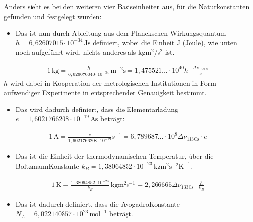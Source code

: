 \documentclass[letterpaper,10pt,english]{jupyterBook}
\begin{document}
\sphinxAtStartPar
Anders sieht es bei den weiteren vier Basiseinheiten aus, für die Naturkonstanten gefunden und festgelegt wurden:
\begin{itemize}
\item {} 
\sphinxAtStartPar
Das  ist nun durch Ableitung aus dem Planckschen Wirkungsquantum \(h = 6,62607015 \cdot 10^{-34}\,\mathrm{Js}\) definiert, wobei die Einheit J (Joule), wie unten noch aufgeführt wird, nichts anderes als kgm\(^2\)/s\(^2\) ist.

\end{itemize}
\begin{equation*}
\begin{split}1\,\mathrm{kg} = \frac{h}{6,626070040 \cdot 10^{-34}}\,\mathrm{m^{−2} s} = 1,475521... \cdot 10^{40} h \cdot \frac{\Delta \nu_\mathrm{133Cs}}{c}\end{split}
\end{equation*}
\sphinxAtStartPar
\(h\) wird dabei in Kooperation der metrologischen Institutionen in Form aufwendiger Experimente in entsprechender Genauigkeit bestimmt.
\begin{itemize}
\item {} 
\sphinxAtStartPar
Das  wird dadurch definiert, dass die Elementarladung \(e = 1,602 176 620 8 \cdot 10^{−19}\,\mathrm{As}\) beträgt:

\end{itemize}
\begin{equation*}
\begin{split} 1\,\mathrm A = \frac{e}{1,6021766208\cdot 10^{−19}}s^{−1} = 6,789687...\cdot 10^8 \Delta \nu_\mathrm{133Cs}\cdot e \end{split}
\end{equation*}\begin{itemize}
\item {} 
\sphinxAtStartPar
Das  ist die Einheit der thermodynamischen Temperatur, über die Boltzmann\sphinxhyphen{}Konstante \(k_B = 1,380 648 52 \cdot 10^{−23}\,\mathrm{kg m^2 s^{−2} K^{−1}}\).

\end{itemize}
\begin{equation*}
\begin{split} 1\,\mathrm K = \frac{1,38064852\cdot 10^{−23}}{k_B}\,\mathrm{kg m^2 s^{−1}} = 2,266665 \Delta \nu_\mathrm{133Cs} \cdot \frac{h}{k_B} \end{split}
\end{equation*}\begin{itemize}
\item {} 
\sphinxAtStartPar
Das  ist dadurch definiert, dass die Avogadro\sphinxhyphen{}Konstante \(N_A = 6,022 140 857 \cdot 10^{23}\,\mathrm{mol^{−1}}\) beträgt.

\end{itemize}
\end{document}
